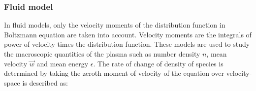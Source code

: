 \documentclass[paper=a4, fontsize=13pt]{scrartcl}
\begin{document}












\subsubsection{Fluid model}

In fluid models, only the velocity moments of the distribution function in Boltzmann equation are taken into account. Velocity moments are the integrals of power of velocity times the distribution function.  These models are used to study the macroscopic quantities of the plasma such as number density $n$, mean velocity $\vec{w}$ and mean energy $\epsilon$. The rate of change of density of species is determined by taking the zeroth moment of velocity of the equation over velocity-space is described as:
\end{document}
